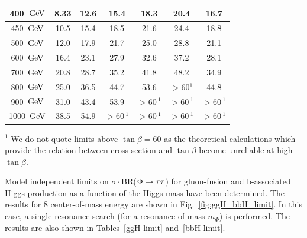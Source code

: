 \begin{table}[!h]
\begin{center}
\begin{tabular}{|c|c|c|c|c|c|c|}
\hline
               400~$\mathrm{GeV}$ &            8.33 &           12.6 &           15.4 &           18.3 &           20.4 &           16.7  \\
\hline
               450~$\mathrm{GeV}$ &           10.5 &           15.4 &           18.5 &           21.6 &           24.4 &           18.8  \\
\hline
               500~$\mathrm{GeV}$ &           12.0 &           17.9 &           21.7 &           25.0 &           28.8 &           21.1  \\
\hline
               600~$\mathrm{GeV}$ &           16.4 &           23.1 &           27.9 &           32.6 &           37.2 &           28.1  \\
\hline
               700~$\mathrm{GeV}$ &           20.8 &           28.7 &           35.2 &           41.8 &           48.2 &           34.9  \\
\hline
               800~$\mathrm{GeV}$ &           25.0 &           36.5 &           44.7 &           53.6 &           $> 60$$^{1}$ &           44.8  \\
\hline
               900~$\mathrm{GeV}$ &           31.0 &           43.4 &           53.9 &           $> 60$\,$^{1}$ &          $> 60$\,$^{1}$ &           $> 60$\,$^{1}$  \\
\hline
              1000~$\mathrm{GeV}$ &           38.5 &           54.9 &          $> 60$\,$^{1}$ &           $> 60$\,$^{1}$ &          $> 60$\,$^{1}$ &           $> 60$\,$^{1}$  \\
\hline
 \end{tabular}
    \label{tab-limits}
  \end{center}
$^{1}$ We do not quote limits above $\tan\beta = 60$ as the theoretical calculations
which provide the relation between cross section and $\tan\beta$ 
become unreliable at high $\tan\beta$. 
\end{table}

\clearpage

Model independent limits on $\sigma\cdot$BR($\Phi\to\mathrm{\tau}\mathrm{\tau}$) for gluon-fusion and b-associated Higgs production as a function of the Higgs mass
have been determined.
The results for 8 \TeV center-of-mass energy are shown in Fig.~\ref{fig:ggH_bbH_limit}.
In this case, a single resonance search (for a resonance of mass $m_{\Phi}$) is performed.  The results are also shown in Tables~\ref{ggH-limit} and~\ref{bbH-limit}.



